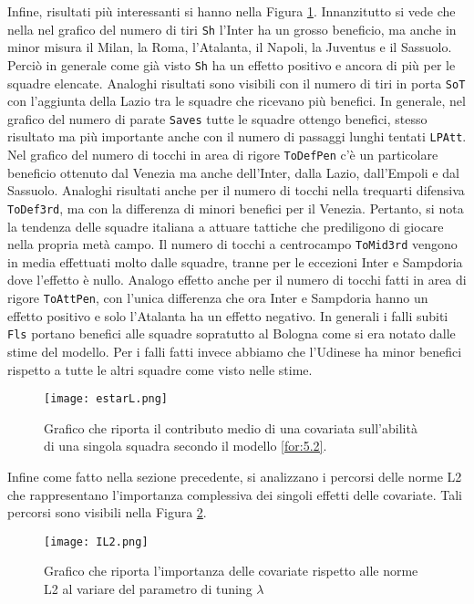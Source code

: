 Infine, risultati più interessanti si hanno nella Figura \ref{fig:effstar3}. Innanzitutto si vede che nella nel grafico del numero di tiri \texttt{Sh} l'Inter ha un grosso beneficio, ma anche in minor misura il Milan, la Roma, l'Atalanta, il Napoli, la Juventus e il Sassuolo. Perciò in generale come già visto \texttt{Sh} ha un effetto positivo e ancora di più per le squadre elencate. Analoghi risultati sono visibili con il numero di tiri in porta \texttt{SoT} con l'aggiunta della Lazio tra le squadre che ricevano più benefici. In generale, nel grafico del numero di parate \texttt{Saves} tutte le squadre ottengo benefici, stesso risultato ma più importante anche con il numero di passaggi lunghi tentati \texttt{LPAtt}. Nel grafico del numero di tocchi in area di rigore \texttt{ToDefPen} c'è un particolare beneficio ottenuto dal Venezia ma anche dell'Inter, dalla Lazio, dall'Empoli e dal Sassuolo. Analoghi risultati anche per il numero di tocchi nella trequarti difensiva \texttt{ToDef3rd}, ma con la differenza di minori benefici per il Venezia. Pertanto, si nota la tendenza delle squadre italiana a attuare tattiche che prediligono di giocare nella propria metà campo. Il numero di tocchi a centrocampo \texttt{ToMid3rd} vengono in media effettuati molto dalle squadre, tranne per le eccezioni Inter e Sampdoria dove l'effetto è nullo. Analogo effetto anche per il numero di tocchi fatti in area di rigore \texttt{ToAttPen}, con l'unica differenza che ora Inter e Sampdoria hanno un effetto positivo e solo l'Atalanta ha un effetto negativo. In generali i falli subiti \texttt{Fls} portano benefici alle squadre sopratutto al Bologna come si era notato dalle stime del modello. Per i falli fatti invece abbiamo che l'Udinese ha minor benefici rispetto a tutte le altri squadre come visto nelle stime.\\
\begin{figure}[htbp]
	\begin{center}
		\texttt{[image: estarL.png]}
		\caption{Grafico che riporta il contributo medio di una covariata sull'abilità di una singola squadra secondo il modello \ref{for:5.2}.} \label{fig:effstar3}
	\end{center}
\end{figure}

Infine come fatto nella sezione precedente, si analizzano i percorsi delle norme L2 che rappresentano l'importanza complessiva dei singoli effetti delle covariate. Tali percorsi sono visibili nella Figura \ref{fig:IL2}.

\begin{figure}[htbp]
	\begin{center}
		\texttt{[image: IL2.png]}
		\caption{Grafico che riporta l'importanza delle covariate rispetto alle norme L2 al variare del parametro di tuning $\lambda$} \label{fig:IL2}
	\end{center}
\end{figure}

